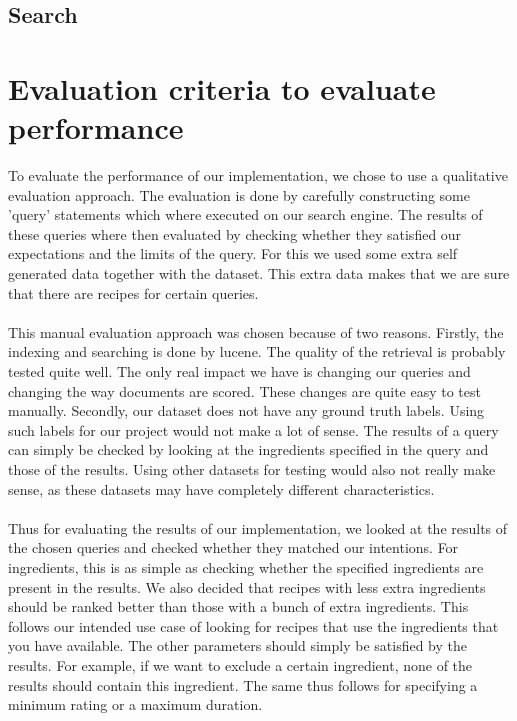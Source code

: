 \documentclass{article}
\begin{document}
\subsection{Search}

\section{Evaluation criteria to evaluate performance}

To evaluate the performance of our implementation,
we chose to use a qualitative evaluation approach.
The evaluation is done by carefully constructing some 'query' statements
which where executed on our search engine.
The results of these queries where then evaluated by checking whether they
satisfied our expectations and the limits of the query.
For this we used some extra self generated data together with the dataset.
This extra data makes that we are sure that there are recipes for certain queries.
\\~\\
This manual evaluation approach was chosen because of two reasons.
Firstly, the indexing and searching is done by lucene.
The quality of the retrieval is probably tested quite well.
The only real impact we have is changing our queries and changing the way
documents are scored.
These changes are quite easy to test manually.
Secondly, our dataset does not have any ground truth labels.
Using such labels for our project would not make a lot of sense.
The results of a query can simply be checked by looking at the ingredients
specified in the query and those of the results.
Using other datasets for testing would also not really make sense,
as these datasets may have completely different characteristics.
\\~\\
Thus for evaluating the results of our implementation,
we looked at the results of the chosen queries and checked whether they
matched our intentions.
For ingredients, this is as simple as checking whether the specified
ingredients are present in the results.
We also decided that recipes with less extra ingredients should be ranked
better than those with a bunch of extra ingredients.
This follows our intended use case of looking for recipes that use the
ingredients that you have available.
The other parameters should simply be satisfied by the results.
For example, if we want to exclude a certain ingredient,
none of the results should contain this ingredient.
The same thus follows for specifying a minimum rating or a maximum duration.
\end{document}
